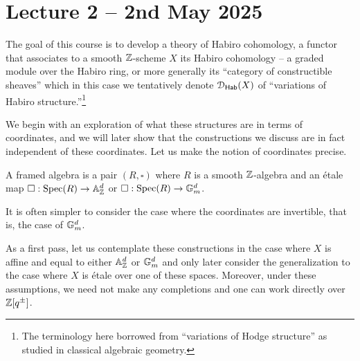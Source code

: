 \section{Lecture 2 -- 2nd May 2025}\label{sec: lecture 2}
The goal of this course is to develop a theory of Habiro cohomology, a functor that associates to a smooth $\mathbb{Z}$-scheme $X$ its Habiro cohomology -- a graded module over the Habiro ring, or more generally its ``category of constructible sheaves'' which in this case we tentatively denote $\EuScript{D}_{\mathsf{Hab}}(X)$ of ``variations of Habiro structure.''\footnote{The terminology here borrowed from ``variations of Hodge structure'' as studied in classical algebraic geometry.}

We begin with an exploration of what these structures are in terms of coordinates, and we will later show that the constructions we discuss are in fact independent of these coordinates. Let us make the notion of coordinates precise. 
\begin{definition}\label{def: framed algebra}
    A framed algebra is a pair $(R,\square)$ where $R$ is a smooth $\mathbb{Z}$-algebra and an \'{e}tale map $\square:\operatorname{Spec}(R)\to\mathbb{A}^{d}_{\mathbb{Z}}$ or $\square:\operatorname{Spec}(R)\to\mathbb{G}_{m}^{d}$. 
\end{definition}
\begin{remark}
    It is often simpler to consider the case where the coordinates are invertible, that is, the case of $\mathbb{G}_{m}^{d}$. 
\end{remark}
As a first pass, let us contemplate these constructions in the case where $X$ is affine and equal to either $\mathbb{A}^{d}_{\mathbb{Z}}$ or $\mathbb{G}_{m}^{d}$ and only later consider the generalization to the case where $X$ is \'{e}tale over one of these spaces. Moreover, under these assumptions, we need not make any completions and one can work directly over $\mathbb{Z}[q^{\pm}]$.


